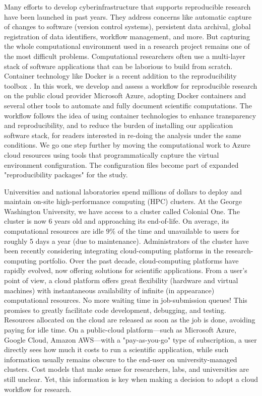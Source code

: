 \documentclass[10pt,journal,compsoc]{IEEEtran}
\begin{document}
Many efforts to develop cyberinfrastructure that supports reproducible research have been launched in past years. 
They address concerns like automatic capture of changes to software (version control systems), persistent data archival, global registration of data identifiers, workflow management, and more. 
But capturing the whole computational environment used in a research project remains one of the most difficult problems. 
Computational researchers often use a multi-layer stack of software applications that can be laborious to build from scratch. 
Container technology like Docker is a recent addition to the reproducibility toolbox \cite{boettiger_2015}. 
In this work, we develop and assess a workflow for reproducible research on the public cloud provider Microsoft Azure, adopting Docker containers and several other tools to automate and fully document scientific computations.
The workflow follows the idea of using container technologies to enhance transparency and reproducibility, and to reduce the burden of installing our application software stack, for readers interested in re-doing the analysis under the same conditions.
We go one step further by moving the computational work to Azure cloud resources using tools that programmatically capture the virtual environment configuration.
The configuration files become part of expanded "reproducibility packages" for the study.

Universities and national laboratories spend millions of dollars to deploy and maintain on-site high-performance computing (HPC) clusters.
At the George Washington University, we have access to a cluster called Colonial One.
The cluster is now $6$ years old and approaching its end-of-life.
On average, its computational resources are idle $9\%$ of the time and unavailable to users for roughly 5 days a year (due to maintenance).
Administrators of the cluster have been recently considering integrating cloud-computing platforms in the research-computing portfolio. 
Over the past decade, cloud-computing platforms have rapidly evolved, now offering solutions for scientific applications.
From a user's point of view, a cloud platform offers great flexibility (hardware and virtual machines) with instantaneous availability of infinite (in appearance) computational resources.
No more waiting time in job-submission queues!
This promises to greatly facilitate code development, debugging, and testing. Resources allocated on the cloud are released as soon as the job is done, avoiding paying for idle time.
On a public-cloud platform---such as Microsoft Azure, Google Cloud, Amazon AWS---with a "pay-as-you-go" type of subscription, a user directly sees how much it costs to run a scientific application, while such information usually remains obscure to the end-user on university-managed clusters. 
Cost models that make sense for researchers, labs, and universities are still unclear. 
Yet, this information is key when making a decision to adopt a cloud workflow for research. 
\end{document}

